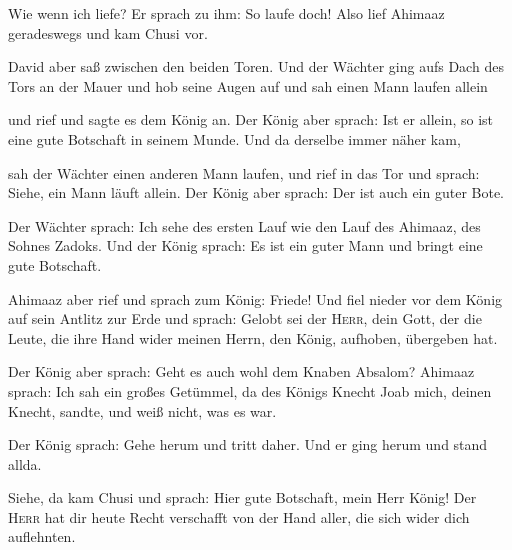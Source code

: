  Wie wenn ich liefe? Er sprach zu ihm: So laufe doch!
Also lief Ahimaaz geradeswegs und kam Chusi vor.

 David aber saß zwischen den beiden Toren. Und der
Wächter ging aufs Dach des Tors an der Mauer und hob seine Augen auf und
sah einen Mann laufen allein

 und rief und sagte es dem König an. Der König aber
sprach: Ist er allein, so ist eine gute Botschaft in seinem Munde. Und
da derselbe immer näher kam,

 sah der Wächter einen anderen Mann laufen, und rief in
das Tor und sprach: Siehe, ein Mann läuft allein. Der König aber sprach:
Der ist auch ein guter Bote.

 Der Wächter sprach: Ich sehe des ersten Lauf wie den
Lauf des Ahimaaz, des Sohnes Zadoks. Und der König sprach: Es ist ein
guter Mann und bringt eine gute Botschaft.

 Ahimaaz aber rief und sprach zum König: Friede! Und fiel
nieder vor dem König auf sein Antlitz zur Erde und sprach: Gelobt sei
der \textsc{Herr}, dein Gott, der die Leute, die ihre Hand wider meinen
Herrn, den König, aufhoben, übergeben hat.

 Der König aber sprach: Geht es auch wohl dem Knaben
Absalom? Ahimaaz sprach: Ich sah ein großes Getümmel, da des Königs
Knecht Joab mich, deinen Knecht, sandte, und weiß nicht, was es war.

 Der König sprach: Gehe herum und tritt daher. Und er
ging herum und stand allda.

 Siehe, da kam Chusi und sprach: Hier gute Botschaft,
mein Herr König! Der \textsc{Herr} hat dir heute Recht verschafft von
der Hand aller, die sich wider dich auflehnten.

